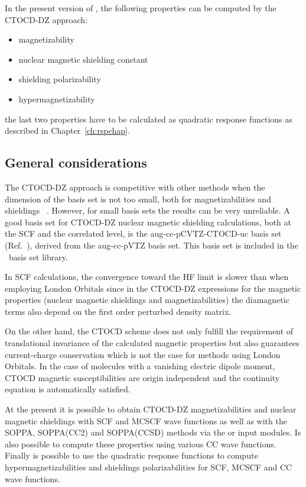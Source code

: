 In the present version of \dalton, the following properties can be computed by
the CTOCD-DZ approach:

\begin{center}
\begin{itemize}{}{}
\item magnetizability
\item nuclear magnetic shielding constant
\item shielding polarizability
\item hypermagnetizability
\end{itemize}
\end{center}
the last two properties have to be calculated as quadratic response functions as described
in Chapter~\ref{ch:rspchap}.

\subsection{General considerations}\label{sec:ctocdgeneral}

The CTOCD-DZ approach is competitive with other methods when the dimension
of the basis set is not too small, both for magnetizabilities and
shieldings ~\cite{ctocd}. However, for small basis sets the results can be
very unreliable. A good basis set for CTOCD-DZ nuclear magnetic shielding
calculations, both at the SCF and the correlated level, is the aug-cc-pCVTZ-CTOCD-uc
basis set (Ref.~\cite{ctocd}), derived from the aug-cc-pVTZ basis set.
This basis set is included in the \dalton\ basis set library.

In SCF calculations, the convergence toward the HF limit is slower
than when employing London Orbitals since in the CTOCD-DZ expressions for
the magnetic properties (nuclear magnetic shieldings and magnetizabilities)
the diamagnetic terms also depend on the first order perturbed density matrix.

On the other hand, the CTOCD scheme does not only fulfill the requirement of
translational invariance of the calculated magnetic properties but also
guarantees current-charge conservation which is not the case for methods using
London Orbitals. In the case of molecules with a vanishing electric dipole
moment, CTOCD magnetic susceptibilities are origin independent and the
continuity equation is automatically satisfied.

At the present it is possible to obtain CTOCD-DZ magnetizabilities and
nuclear magnetic shieldings with SCF and MCSCF wave functions as well
as with the SOPPA, SOPPA(CC2) and SOPPA(CCSD) methods via the
 or  input modules. Is also possible to
compute these properties using various CC wave functions. Finally is
possible to use the quadratic response functions to compute
hypermagnetizabilities and shieldings polarizabilities for SCF, MCSCF
and CC wave functions.

